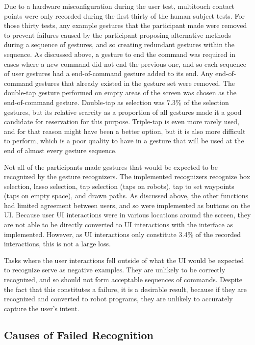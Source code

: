 Due to a hardware misconfiguration during the user test, multitouch contact points were only recorded during the first thirty of the human subject tests. 
For those thirty tests, any example gestures that the participant made were removed to prevent failures caused by the participant proposing alternative methods during a sequence of gestures, and so creating redundant gestures within the sequence. 
As discussed above, a gesture to end the command was required in cases where a new command did not end the previous one, and so each sequence of user gestures had a end-of-command gesture added to its end. 
Any end-of-command gestures that already existed in the gesture set were removed. 
The double-tap gesture performed on empty areas of the screen was chosen as the end-of-command gesture. 
Double-tap as selection was 7.3\% of the selection gestures, but its relative scarcity as a proportion of all gestures made it a good candidate for reservation for this purpose. 
Triple-tap is even more rarely used, and for that reason might have been a better option, but it is also more difficult to perform, which is a poor quality to have in a gesture that will be used at the end of almost every gesture sequence. 

Not all of the participants made gestures that would be expected to be recognized by the gesture recognizers. 
The implemented recognizers recognize box selection, lasso selection, tap selection (taps on robots), tap to set waypoints (taps on empty space), and drawn paths. 
As discussed above, the other functions had limited agreement between users, and so were implemented as buttons on the UI. 
Because user UI interactions were in various locations around the screen, they are not able to be directly converted to UI interactions with the interface as implemented. 
However, as UI interactions only constitute 3.4\% of the recorded interactions, this is not a large loss. 

Tasks where the user interactions fell outside of what the UI would be expected to recognize serve as negative examples.
They are unlikely to be correctly recognized, and so should not form acceptable sequences of commands. 
Despite the fact that this constitutes a failure, it is a desirable result, because if they are recognized and converted to robot programs, they are unlikely to accurately capture the user's intent. 

\subsection{Causes of Failed Recognition}

